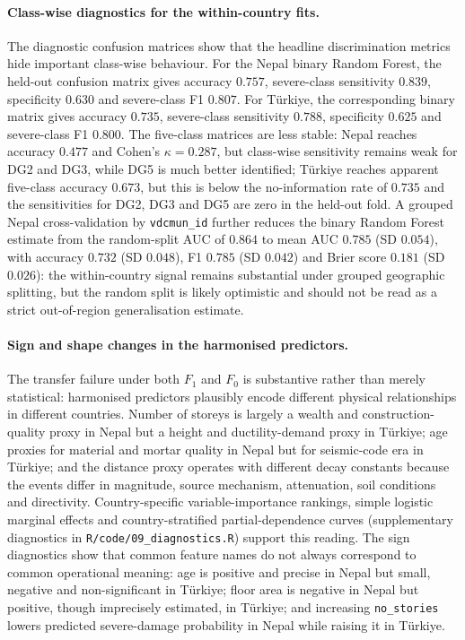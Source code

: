 \documentclass[11pt,a4paper]{article}
\begin{document}
\paragraph{Class-wise diagnostics for the within-country fits.} The diagnostic confusion matrices show that the headline discrimination metrics hide important class-wise behaviour. For the Nepal binary Random Forest, the held-out confusion matrix gives accuracy $0.757$, severe-class sensitivity $0.839$, specificity $0.630$ and severe-class F1 $0.807$. For T\"urkiye, the corresponding binary matrix gives accuracy $0.735$, severe-class sensitivity $0.788$, specificity $0.625$ and severe-class F1 $0.800$. The five-class matrices are less stable: Nepal reaches accuracy $0.477$ and Cohen's $\kappa=0.287$, but class-wise sensitivity remains weak for DG2 and DG3, while DG5 is much better identified; T\"urkiye reaches apparent five-class accuracy $0.673$, but this is below the no-information rate of $0.735$ and the sensitivities for DG2, DG3 and DG5 are zero in the held-out fold. A grouped Nepal cross-validation by \texttt{vdcmun\_id} further reduces the binary Random Forest estimate from the random-split AUC of $0.864$ to mean AUC $0.785$ (SD $0.054$), with accuracy $0.732$ (SD $0.048$), F1 $0.785$ (SD $0.042$) and Brier score $0.181$ (SD $0.026$): the within-country signal remains substantial under grouped geographic splitting, but the random split is likely optimistic and should not be read as a strict out-of-region generalisation estimate.

\paragraph{Sign and shape changes in the harmonised predictors.} The transfer failure under both $F_1$ and $F_0$ is substantive rather than merely statistical: harmonised predictors plausibly encode different physical relationships in different countries. Number of storeys is largely a wealth and construction-quality proxy in Nepal but a height and ductility-demand proxy in T\"urkiye; age proxies for material and mortar quality in Nepal but for seismic-code era in T\"urkiye; and the distance proxy operates with different decay constants because the events differ in magnitude, source mechanism, attenuation, soil conditions and directivity. Country-specific variable-importance rankings, simple logistic marginal effects and country-stratified partial-dependence curves (supplementary diagnostics in \texttt{R/code/09\_diagnostics.R}) support this reading. The sign diagnostics show that common feature names do not always correspond to common operational meaning: age is positive and precise in Nepal but small, negative and non-significant in T\"urkiye; floor area is negative in Nepal but positive, though imprecisely estimated, in T\"urkiye; and increasing \texttt{no\_stories} lowers predicted severe-damage probability in Nepal while raising it in T\"urkiye.
\end{document}
